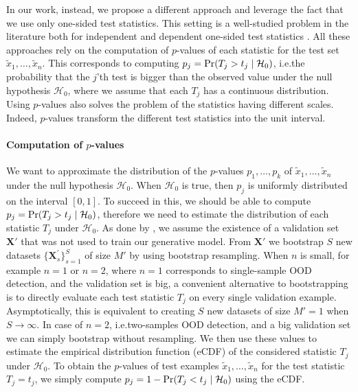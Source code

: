 {In our work, instead, we propose a different approach and leverage the fact that we use only one-sided test statistics. This setting is a well-studied problem in the literature both for independent \parencite{fisher_statistical_1925, folks_asymptotic_1971} and dependent one-sided test statistics \parencite{brown_400_1975, wilson_harmonic_2019}. All these approaches rely on the computation of $p$-values of each statistic for the test set $\tilde{x}_1,\ldots,\tilde{x}_n$. This corresponds to computing
$p_j = \textup{Pr}(T_j > t_j \mid \mathcal{H}_0)$, i.e.\@ the probability that the $j$'th test is bigger than the observed value under the null hypothesis $\mathcal{H}_0$, where we assume that each $T_j$ has a continuous distribution. Using $p$-values also solves the problem of the statistics having different scales. Indeed, $p$-values transform the different test statistics into the unit interval.

\paragraph{Computation of $p$-values} 
We want to approximate the distribution of the $p$-values $p_1, \ldots, p_k$ of $\tilde{x}_1,\ldots,\tilde{x}_n$ under the null hypothesis $\mathcal{H}_0$. When $\mathcal{H}_0$ is true, then $p_j$ is uniformly distributed on the interval $[0,1]$. To succeed in this, we should be able to compute $p_j = \textup{Pr}(T_j > t_j \mid \mathcal{H}_0)$, therefore we need to estimate the distribution of each statistic $T_j$ under $\mathcal{H}_0$. %
As done by \textcite{nalisnick_detecting_2019}, we assume the existence of a validation set $\mathbf{X}'$ that was not used to train our generative model. From $\mathbf{X}'$ we bootstrap $S$ new datasets $\{\mathbf{X}^{'}_s\}_{s=1}^{S}$ of size $M'$ by using bootstrap resampling. When $n$ is small, for example $n=1$ or $n=2$, where $n=1$ corresponds to single-sample OOD detection, and the validation set is big, a convenient alternative to bootstrapping is to directly evaluate each test statistic $T_j$ on every single validation example. Asymptotically, this is equivalent to creating $S$ new datasets of size $M'=1$ when $S \rightarrow \infty$. In case of $n=2$, i.e.\@ two-samples OOD detection, and a big validation set we can simply bootstrap without resampling.
We then use these values to estimate the empirical distribution function (eCDF) of the considered statistic $T_j$ under $\mathcal{H}_0$. To obtain the $p$-values of test examples $\tilde{x}_1,\ldots, \tilde{x}_n$ for the test statistic $T_j = t_j$, we simply compute $p_j = 1 - \textup{Pr}(T_j < t_j \mid \mathcal{H}_0)$ using the eCDF.

}
